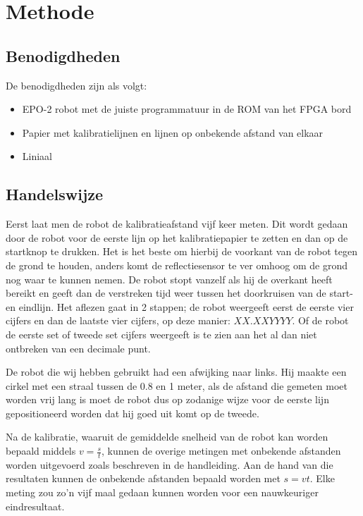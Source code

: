 \chapter{Methode}
\section{Benodigdheden}
De benodigdheden zijn als volgt:
\begin{itemize}
\item EPO-2 robot met de juiste programmatuur in de ROM van het FPGA bord
\item Papier met kalibratielijnen en lijnen op onbekende afstand van elkaar
\item Liniaal
\end{itemize}
\section{Handelswijze}
Eerst laat men de robot de kalibratieafstand vijf keer meten. Dit wordt gedaan door de robot voor de eerste lijn op het kalibratiepapier te zetten en dan op de startknop te drukken. Het is het beste om hierbij de voorkant van de robot tegen de grond te houden, anders komt de reflectiesensor te ver omhoog om de grond nog waar te kunnen nemen. De robot stopt vanzelf als hij de overkant heeft bereikt en geeft dan de verstreken tijd weer tussen het doorkruisen van de start- en eindlijn. Het aflezen gaat in 2 stappen; de robot weergeeft eerst de eerste vier cijfers en dan de laatste vier cijfers, op deze manier: $XX.XXYYYY$. Of de robot de eerste set of tweede set cijfers weergeeft is te zien aan het al dan niet ontbreken van een decimale punt. 

De robot die wij hebben gebruikt had een afwijking naar links. Hij maakte een cirkel met een straal tussen de 0.8 en 1 meter, als de afstand die gemeten moet worden vrij lang is moet de robot dus op zodanige wijze voor de eerste lijn gepositioneerd worden dat hij goed uit komt op de tweede.

Na de kalibratie, waaruit de gemiddelde snelheid van de robot kan worden bepaald middels $v=\frac{s}{t}$, kunnen de overige metingen met onbekende afstanden worden uitgevoerd zoals beschreven in de handleiding. Aan de hand van die resultaten kunnen de onbekende afstanden bepaald worden met $s=vt$. Elke meting zou zo'n vijf maal gedaan kunnen worden voor een nauwkeuriger eindresultaat.
